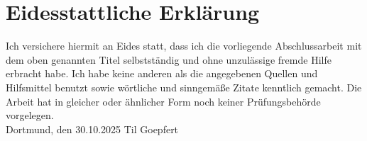 \newpage
\section*{Eidesstattliche Erklärung}
\thispagestyle{empty}
Ich versichere hiermit an Eides statt, dass ich die vorliegende Abschlussarbeit mit dem oben genannten Titel selbstständig und ohne unzulässige fremde Hilfe erbracht habe. Ich habe keine anderen als die angegebenen Quellen und Hilfsmittel benutzt sowie wörtliche und sinngemäße Zitate kenntlich gemacht. Die Arbeit hat in gleicher oder ähnlicher Form noch keiner Prüfungsbehörde vorgelegen.
\vspace{4\baselineskip}\\
Dortmund, den 30.10.2025 \hfill Til Goepfert
\vspace{4\baselineskip}

